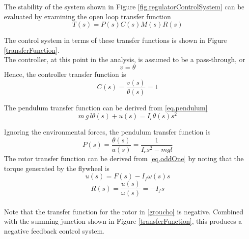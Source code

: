 \documentclass[12pt,letterpaper]{article}
\begin{document}
The stability of the system shown in Figure  \ref{fig.regulatorControlSystem} can be evaluated by examining the
open loop transfer function
\begin{equation}
    T(s) = P(s) C(s) M(s) R(s)
\end{equation}



The control system in terms of these transfer functions is shown in Figure \ref{transferFunction}.\\


The controller, at this point in the analysis, is assumed to be a pass-through, or
%
\begin{equation}
v = \theta
\end{equation}
Hence, the controller transfer function is
\begin{equation}
C(s) = \frac{v(s)}{\theta(s)} = 1
    \label{EQ.simpleController}
\end{equation}

The pendulum transfer function can be derived from \eqref{eq.pendulum}
%
\begin{equation}
    m \,g \,l \theta(s) + u(s) = I_{c}\theta(s) s^{2}
\end{equation}

Ignoring the environmental forces, the pendulum transfer function is 
\begin{equation}
    P(s) = \frac{\theta(s)}{u(s)}= \frac{1}{I_{c} s^{2} - m g l }
    \label{franco}
\end{equation}
%
The rotor transfer function can be derived from \eqref{eq.oddOne} by noting that the torque generated by the flywheel is
\begin{equation}
    u(s) = F(s) - I_{f}\omega(s) s
\end{equation}
%
\begin{equation}
    R(s) = \frac{u(s)}{\omega(s)} = -I_{f} s
    \label{groucho}
\end{equation}\\

Note that the transfer function for the rotor in \eqref{groucho} is negative.  Combined with the summing
junction shown in Figure \ref{transferFunction}, this produces a negative feedback control system.\\
 
\end{document}

